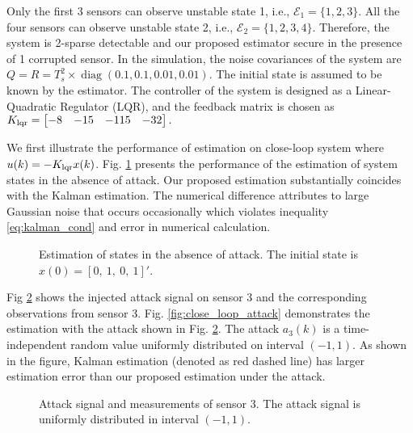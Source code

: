 \documentclass[12pt]{article}  %
\newcommand{\Ec}{{\mathcal{E}}} %
\DeclareMathOperator{\diag}{{diag}}
\begin{document}
Only the first 3 sensors can observe unstable state 1, i.e., $\Ec_1=\{1,2,3\}$. All the four sensors can observe unstable state 2, i.e., $\Ec_2=\{1,2,3,4\}$.
Therefore, the system is 2-sparse detectable and our proposed estimator secure in the presence of 1 corrupted sensor. 
In the simulation, the noise covariances of the system are $Q=R=T_s^2\times\diag(0.1,0.1,0.01,0.01)$.
The initial state is assumed to be known by the estimator.
The controller of the system is designed as a Linear-Quadratic Regulator (LQR), and the feedback matrix is chosen as $K_{\rm lqr}=\begin{bmatrix}
	-8& -15& -115 &-32
 \end{bmatrix}.
$
%
%
%


We first illustrate the performance of estimation on close-loop system where $u(k)=-K_{\rm lqr} x(k)$.
Fig. \ref{fig:close_loop} presents the performance of the estimation of system states in the absence of attack. Our proposed estimation substantially coincides with the Kalman estimation. The numerical difference attributes to large Gaussian noise that occurs occasionally which violates inequality \eqref{eq:kalman_cond} and error in numerical calculation.


\begin{figure}[htpb!]
	\centering
	
	\caption{Estimation of states in the absence of attack. The initial state is $x(0)=[0,\ 1,\ 0,\ 1]{'}$. } \label{fig:close_loop}
\end{figure}

Fig \ref{fig:attack_signal} shows the injected attack signal on sensor 3 and the corresponding observations from sensor 3.
Fig. \ref{fig:close_loop_attack} demonstrates the estimation with the attack shown in Fig. \ref{fig:attack_signal}.
The attack $a_3(k)$ is a time-independent random value uniformly distributed on interval $(-1,1)$. As shown in the figure, Kalman estimation (denoted as red dashed line) has larger estimation error than our proposed estimation under the attack.

\begin{figure}[ht]
	\centering
	
	\caption{Attack signal and measurements of sensor 3. The attack signal is uniformly distributed in interval $(-1,1)$.  } \label{fig:attack_signal}
\end{figure}
\end{document}
